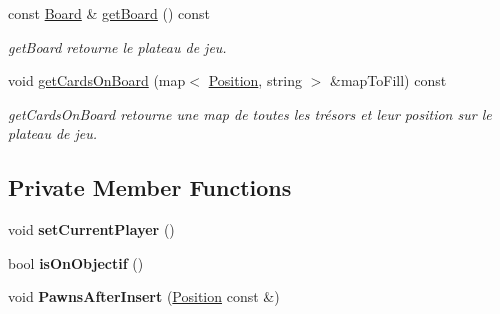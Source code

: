 \begin{DoxyCompactItemize}
const \mbox{\hyperlink{class_board}{Board}} \& \mbox{\hyperlink{class_game_a0df3fa77221ce465d013d4faf08c0a84}{get\+Board}} () const
\begin{DoxyCompactList}\small\item\em get\+Board retourne le plateau de jeu. \end{DoxyCompactList}\item 
void \mbox{\hyperlink{class_game_a1a21ba908bedd3ca0ae4ea0f63c621d4}{get\+Cards\+On\+Board}} (map$<$ \mbox{\hyperlink{class_position}{Position}}, string $>$ \&map\+To\+Fill) const
\begin{DoxyCompactList}\small\item\em get\+Cards\+On\+Board retourne une map de toutes les trésors et leur position sur le plateau de jeu. \end{DoxyCompactList}\end{DoxyCompactItemize}
\subsection*{Private Member Functions}
\begin{DoxyCompactItemize}
\item 
\mbox{\label{class_game_a19e1908108f33089972f795ed7489473}} 
void {\bfseries set\+Current\+Player} ()
\item 
\mbox{\label{class_game_aea83fb571c99bbfd36b19ecb146b164e}} 
bool {\bfseries is\+On\+Objectif} ()
\item 
\mbox{\label{class_game_a8900e49eb32ff7be3d52ceeae0ce8f1a}} 
void {\bfseries Pawns\+After\+Insert} (\mbox{\hyperlink{class_position}{Position}} const \&)
\end{DoxyCompactItemize}
